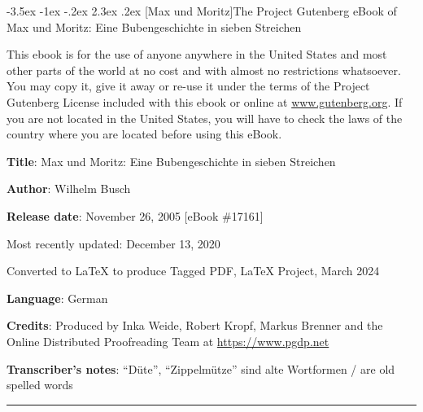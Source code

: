 \documentclass[a4paper,12pt]{article}
\makeatletter
\renewcommand\section{\@startsection {section}{1}{\z@}%
                                   {-3.5ex \@plus -1ex \@minus -.2ex}%
                                   {2.3ex \@plus.2ex}%
                                   {\centering\normalfont\LARGE\bfseries}}
\makeatother
\begin{document}
  
  
\begin{otherlanguage}{english}

  \section[Max und Moritz]{The Project Gutenberg eBook of {Max und
      Moritz: Eine Bubengeschichte in sieben
      Streichen}\label{pg-header-heading}}

    


This ebook is for the use of anyone anywhere in the United States and
most other parts of the world at no cost and with almost no restrictions
whatsoever. You may copy it, give it away or re-use it under the terms
of the Project Gutenberg License included with this ebook or online
at \href{https://www.gutenberg.org}{www.gutenberg.org}. If you are not located in the United States,
you will have to check the laws of the country where you are located
before using this eBook.

    
\end{otherlanguage}


\bigskip

\textbf{Title}: Max und Moritz: Eine Bubengeschichte in sieben Streichen

\textbf{Author}: Wilhelm Busch


\smallskip

\begin{otherlanguage}{english}
\textbf{Release date}: November 26, 2005 [eBook \#17161]

                Most recently updated: December 13, 2020

        Converted to \textsf{\LaTeX} to produce Tagged PDF, \textsf{\LaTeX} Project, March 2024

\smallskip
                
\textbf{Language}: German

\smallskip
                
\textbf{Credits}: Produced by Inka Weide, Robert Kropf, Markus Brenner and
        the Online Distributed Proofreading Team at
        \url{https://www.pgdp.net}


\smallskip

\textbf{Transcriber's notes}: 
``Düte'', ``Zippelmütze'' sind alte Wortformen / are old spelled words
\end{otherlanguage}


\bigskip
\hrule

\clearpage
{}
\end{document}
